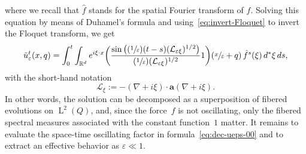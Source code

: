 \documentclass[10pt]{amsart}
\newcommand{\Psfrac}[2]{(\sfrac{#1}{#2})}
\theoremstyle{plain}
\theoremstyle{definition}
\numberwithin{equation}{section}
\newcommand{\e}{\varepsilon}
\newcommand{\Lc}{\mathcal{L}}
\newcommand{\R}{\mathbb R}
\newcommand{\Aa}{\boldsymbol a}
\newcommand{\Ld}{\operatorname{L}}
\begin{document}
where we recall that $\hat f$ stands for the spatial Fourier transform of $f$.
Solving this equation by means of Duhamel's formula and using~\eqref{eq:invert-Floquet} to invert the Floquet transform, we get
\begin{equation}\label{eq:dec-ueps-00}
\tilde u_\e^t(x,q)=\int_0^t\int_{\R^d}e^{i\xi\cdot x} \bigg(\frac{\sin\big(\Psfrac1\e(t-s)(\Lc_{\e \xi})^{1/2}\big)}{\Psfrac1\e(\Lc_{\e \xi})^{1/2}}1\bigg)(\sfrac x\e+q)\,\hat f^s(\xi)\,d^*\xi\,ds,
\end{equation}
with the short-hand notation
\begin{equation}\label{eq:defLxi}
\Lc_{\xi}:=-(\nabla+i\xi)\cdot\Aa(\nabla+i\xi).
\end{equation}
In other words, the solution can be decomposed as a superposition of fibered evolutions on $\Ld^2(Q)$, and, since the force~$f$ is not oscillating, only the fibered spectral measures associated with the constant function~$1$ matter.
It remains to evaluate the space-time oscillating factor in formula~\eqref{eq:dec-ueps-00} and to extract an effective behavior as $\e\ll1$.
\end{document}
